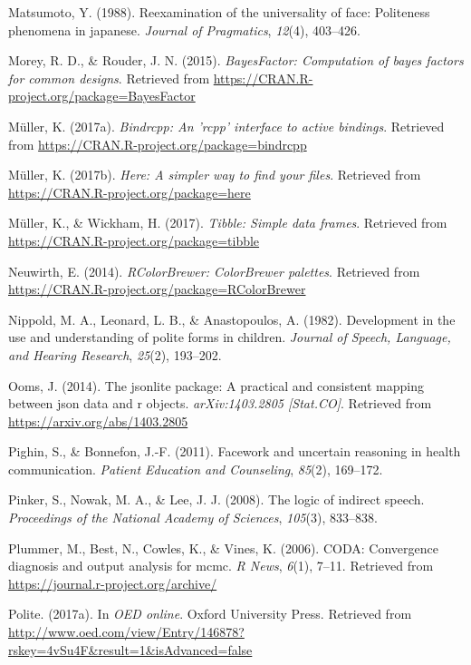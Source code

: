 \documentclass[oneside]{report}
\begin{document}
\hypertarget{ref-matsumoto1988}{}
Matsumoto, Y. (1988). Reexamination of the universality of face:
Politeness phenomena in japanese. \emph{Journal of Pragmatics},
\emph{12}(4), 403--426.

\hypertarget{ref-R-BayesFactor}{}
Morey, R. D., \& Rouder, J. N. (2015). \emph{BayesFactor: Computation of
bayes factors for common designs}. Retrieved from
\url{https://CRAN.R-project.org/package=BayesFactor}

\hypertarget{ref-R-bindrcpp}{}
Müller, K. (2017a). \emph{Bindrcpp: An 'rcpp' interface to active
bindings}. Retrieved from
\url{https://CRAN.R-project.org/package=bindrcpp}

\hypertarget{ref-R-here}{}
Müller, K. (2017b). \emph{Here: A simpler way to find your files}.
Retrieved from \url{https://CRAN.R-project.org/package=here}

\hypertarget{ref-R-tibble}{}
Müller, K., \& Wickham, H. (2017). \emph{Tibble: Simple data frames}.
Retrieved from \url{https://CRAN.R-project.org/package=tibble}

\hypertarget{ref-R-RColorBrewer}{}
Neuwirth, E. (2014). \emph{RColorBrewer: ColorBrewer palettes}.
Retrieved from \url{https://CRAN.R-project.org/package=RColorBrewer}

\hypertarget{ref-nippold1982}{}
Nippold, M. A., Leonard, L. B., \& Anastopoulos, A. (1982). Development
in the use and understanding of polite forms in children. \emph{Journal
of Speech, Language, and Hearing Research}, \emph{25}(2), 193--202.

\hypertarget{ref-R-jsonlite}{}
Ooms, J. (2014). The jsonlite package: A practical and consistent
mapping between json data and r objects. \emph{arXiv:1403.2805
{[}Stat.CO{]}}. Retrieved from \url{https://arxiv.org/abs/1403.2805}

\hypertarget{ref-pighin2011}{}
Pighin, S., \& Bonnefon, J.-F. (2011). Facework and uncertain reasoning
in health communication. \emph{Patient Education and Counseling},
\emph{85}(2), 169--172.

\hypertarget{ref-pinker2008}{}
Pinker, S., Nowak, M. A., \& Lee, J. J. (2008). The logic of indirect
speech. \emph{Proceedings of the National Academy of Sciences},
\emph{105}(3), 833--838.

\hypertarget{ref-R-coda}{}
Plummer, M., Best, N., Cowles, K., \& Vines, K. (2006). CODA:
Convergence diagnosis and output analysis for mcmc. \emph{R News},
\emph{6}(1), 7--11. Retrieved from
\url{https://journal.r-project.org/archive/}

\hypertarget{ref-oxfordPolite}{}
Polite. (2017a). In \emph{OED online}. Oxford University Press.
Retrieved from
\url{http://www.oed.com/view/Entry/146878?rskey=4vSu4F\&result=1\&isAdvanced=false}
\end{document}
